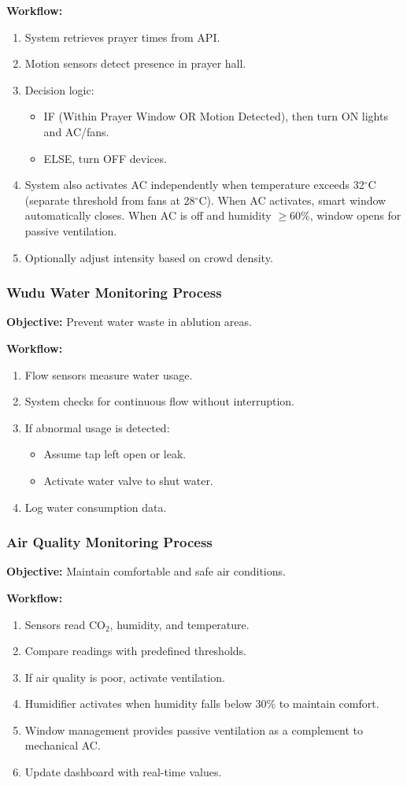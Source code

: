 \textbf{Workflow:}
\begin{enumerate}
  \item System retrieves prayer times from API.
  \item Motion sensors detect presence in prayer hall.
  \item Decision logic:
  \begin{itemize}
    \item IF (Within Prayer Window OR Motion Detected), then turn ON lights and AC/fans.
    \item ELSE, turn OFF devices.
  \end{itemize}
  \item System also activates AC independently when temperature exceeds 32$^\circ$C (separate threshold from fans at 28$^\circ$C). When AC activates, smart window automatically closes. When AC is off and humidity $\geq 60\%$, window opens for passive ventilation.
  \item Optionally adjust intensity based on crowd density.
\end{enumerate}

\subsubsection{Wudu Water Monitoring Process}
\textbf{Objective:} Prevent water waste in ablution areas.

\textbf{Workflow:}
\begin{enumerate}
  \item Flow sensors measure water usage.
  \item System checks for continuous flow without interruption.
  \item If abnormal usage is detected:
  \begin{itemize}
    \item Assume tap left open or leak.
    \item Activate water valve to shut water.
  \end{itemize}
  \item Log water consumption data.
\end{enumerate}

\subsubsection{Air Quality Monitoring Process}
\textbf{Objective:} Maintain comfortable and safe air conditions.

\textbf{Workflow:}
\begin{enumerate}
  \item Sensors read CO$_2$, humidity, and temperature.
  \item Compare readings with predefined thresholds.
  \item If air quality is poor, activate ventilation.
  \item Humidifier activates when humidity falls below 30\% to maintain comfort.
  \item Window management provides passive ventilation as a complement to mechanical AC.
  \item Update dashboard with real-time values.
\end{enumerate}

